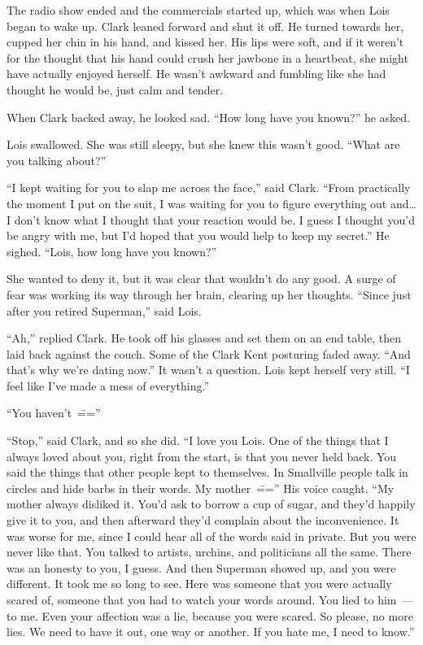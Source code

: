 \documentclass[ebook,12pt]{memoir}
\begin{document}
The radio show ended and the commercials started up, which was when Lois
began to wake up. Clark leaned forward and shut it off. He turned
towards her, cupped her chin in his hand, and kissed her. His lips were
soft, and if it weren't for the thought that his hand could crush her
jawbone in a heartbeat, she might have actually enjoyed herself. He
wasn't awkward and fumbling like she had thought he would be, just calm
and tender.

When Clark backed away, he looked sad. ``How long have you known?'' he
asked.

Lois swallowed. She was still sleepy, but she knew this wasn't good.
``What are you talking about?''

``I kept waiting for you to slap me across the face,'' said Clark.
``From practically the moment I put on the suit, I was waiting for you
to figure everything out and\ldots{} I don't know what I thought that
your reaction would be. I guess I thought you'd be angry with me, but
I'd hoped that you would help to keep my secret.'' He sighed. ``Lois,
how long have you known?''

She wanted to deny it, but it was clear that wouldn't do any good. A
surge of fear was working its way through her brain, clearing up her
thoughts. ``Since just after you retired Superman,'' said Lois.

``Ah,'' replied Clark. He took off his glasses and set them on an end
table, then laid back against the couch. Some of the Clark Kent
posturing faded away. ``And that's why we're dating now.'' It wasn't a
question. Lois kept herself very still. ``I feel like I've made a mess
of everything.''

``You haven't~\===''

``Stop,'' said Clark, and so she did. ``I love you Lois. One of the
things that I always loved about you, right from the start, is that you
never held back. You said the things that other people kept to
themselves. In Smallville people talk in circles and hide barbs in their
words. My mother~\==='' His voice caught. ``My mother always disliked it.
You'd ask to borrow a cup of sugar, and they'd happily give it to you,
and then afterward they'd complain about the inconvenience. It was worse
for me, since I could hear all of the words said in private. But you
were never like that. You talked to artists, urchins, and politicians
all the same. There was an honesty to you, I guess. And then Superman
showed up, and you were different. It took me so long to see. Here was
someone that you were actually scared of, someone that you had to watch
your words around. You lied to him~--- to me. Even your affection was a
lie, because you were scared. So please, no more lies. We need to have
it out, one way or another. If you hate me, I need to know.''
\end{document}
